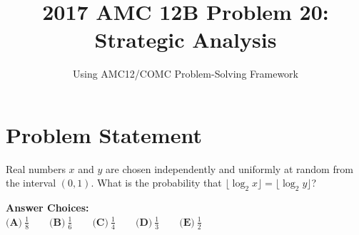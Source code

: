 \documentclass[11pt]{article}
\title{\textbf{2017 AMC 12B Problem 20: Strategic Analysis}}
\author{Using AMC12/COMC Problem-Solving Framework}
\date{}
\begin{document}
\maketitle

\section*{Problem Statement}
Real numbers $x$ and $y$ are chosen independently and uniformly at random from the interval $(0,1)$. What is the probability that $\lfloor\log_2x\rfloor=\lfloor\log_2y\rfloor$?

\textbf{Answer Choices:}\\
$\textbf{(A)}\ \frac{1}{8}\qquad\textbf{(B)}\ \frac{1}{6}\qquad\textbf{(C)}\ \frac{1}{4}\qquad\textbf{(D)}\ \frac{1}{3}\qquad\textbf{(E)}\ \frac{1}{2}$
\end{document}
